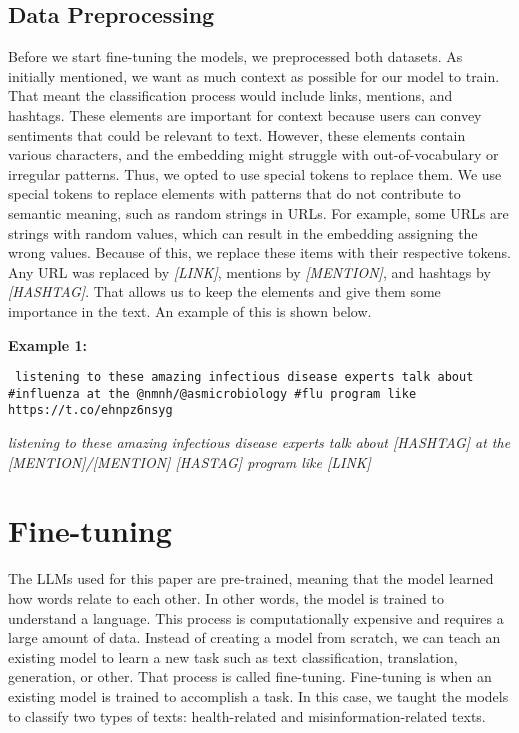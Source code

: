 \subsection{Data Preprocessing}
Before we start fine-tuning the models, we preprocessed both datasets. As initially mentioned, we want as much context as possible for our model to train. That meant the classification
process would include links, mentions, and hashtags. These elements are important for context because users can convey sentiments that could be relevant to text. However, these elements contain various characters, and the embedding might struggle with out-of-vocabulary or irregular
patterns. Thus, we opted to use special tokens to replace them. We use special tokens to replace elements with patterns that do not contribute to semantic meaning, such as random
strings in URLs. For example, some URLs are strings with random values, which can result in the embedding assigning the wrong values. Because of this, we replace these items with
their respective tokens. Any URL was replaced by \textit{[LINK]}, mentions by \textit{[MENTION]}, and hashtags by \textit{[HASHTAG]}. That allows us to keep the elements and give them some importance in the text. An example of this is shown below.

\noindent \textbf{Example 1:}
 \begin{tcolorbox}[colback=gray!10, colframe=black!70, title=Original Text]
	\texttt{%
listening to these amazing infectious disease experts talk about \#influenza at the @nmnh/@asmicrobiology \#flu program like https://t.co/ehnpz6nsyg
	}
\end{tcolorbox}

\begin{tcolorbox}[colback=white, colframe=black!70, title=Preprocessed Result]
	\textit{%
listening to these amazing infectious disease experts talk about [HASHTAG] at the [MENTION]/[MENTION] [HASTAG] program like [LINK]
	}
\end{tcolorbox}


\section{Fine-tuning}

The LLMs used for this paper are pre-trained, meaning that the model learned how words relate to each other. In other words, the model is trained to understand a language.
This process is computationally expensive and requires a large amount of data. Instead of creating a model from scratch, we can teach an existing model to learn a new task such as text classification, translation, generation, or other. That process is called fine-tuning. Fine-tuning is when an existing model is trained to accomplish a task. In this case, we taught the models to classify two types of texts: health-related and misinformation-related texts. 

